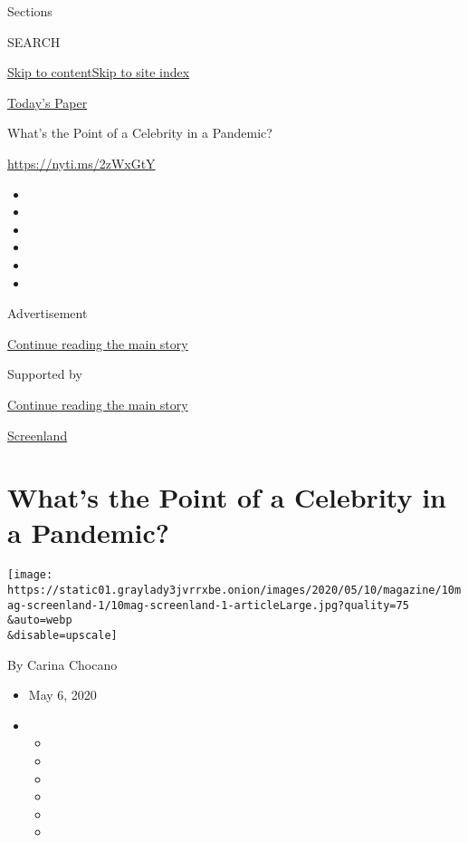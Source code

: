 Sections

SEARCH

\protect\hyperlink{site-content}{Skip to
content}\protect\hyperlink{site-index}{Skip to site index}

\href{https://myaccount.nytimes3xbfgragh.onion/auth/login?response_type=cookie\&client_id=vi}{}

\href{https://www.nytimes3xbfgragh.onion/section/todayspaper}{Today's
Paper}

What's the Point of a Celebrity in a Pandemic?

\url{https://nyti.ms/2zWxGtY}

\begin{itemize}
\item
\item
\item
\item
\item
\item
\end{itemize}

Advertisement

\protect\hyperlink{after-top}{Continue reading the main story}

Supported by

\protect\hyperlink{after-sponsor}{Continue reading the main story}

\href{/column/screenland}{Screenland}

\hypertarget{whats-the-point-of-a-celebrity-in-a-pandemic}{%
\section{What's the Point of a Celebrity in a
Pandemic?}\label{whats-the-point-of-a-celebrity-in-a-pandemic}}

\texttt{[image: https://static01.graylady3jvrrxbe.onion/images/2020/05/10/magazine/10mag-screenland-1/10mag-screenland-1-articleLarge.jpg?quality=75\\\&auto=webp\\\&disable=upscale]}

By Carina Chocano

\begin{itemize}
\item
  May 6, 2020
\item
  \begin{itemize}
  \item
  \item
  \item
  \item
  \item
  \item
  \end{itemize}
\end{itemize}

